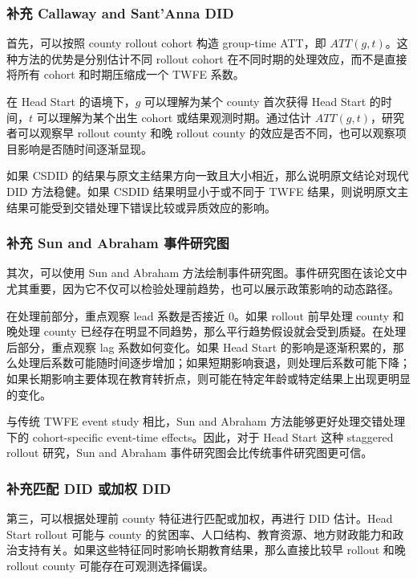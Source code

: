 \documentclass[
  fontset=windows]{ctexart}
\begin{document}
\subsubsection{补充 Callaway and Sant'Anna
DID}\label{ux8865ux5145-callaway-and-santanna-did}

首先，可以按照 county rollout cohort 构造 group-time ATT，即
\(ATT(g,t)\)。这种方法的优势是分别估计不同 rollout cohort
在不同时期的处理效应，而不是直接将所有 cohort 和时期压缩成一个 TWFE
系数。

在 Head Start 的语境下，\(g\) 可以理解为某个 county 首次获得 Head Start
的时间，\(t\) 可以理解为某个出生 cohort 或结果观测时期。通过估计
\(ATT(g,t)\)，研究者可以观察早 rollout county 和晚 rollout county
的效应是否不同，也可以观察项目影响是否随时间逐渐显现。

如果 CSDID 的结果与原文主结果方向一致且大小相近，那么说明原文结论对现代
DID 方法稳健。如果 CSDID 结果明显小于或不同于 TWFE
结果，则说明原文主结果可能受到交错处理下错误比较或异质效应的影响。

\subsubsection{补充 Sun and Abraham
事件研究图}\label{ux8865ux5145-sun-and-abraham-ux4e8bux4ef6ux7814ux7a76ux56fe}

其次，可以使用 Sun and Abraham
方法绘制事件研究图。事件研究图在该论文中尤其重要，因为它不仅可以检验处理前趋势，也可以展示政策影响的动态路径。

在处理前部分，重点观察 lead 系数是否接近 0。如果 rollout 前早处理 county
和晚处理 county
已经存在明显不同趋势，那么平行趋势假设就会受到质疑。在处理后部分，重点观察
lag 系数如何变化。如果 Head Start
的影响是逐渐积累的，那么处理后系数可能随时间逐步增加；如果短期影响衰退，则处理后系数可能下降；如果长期影响主要体现在教育转折点，则可能在特定年龄或特定结果上出现更明显的变化。

与传统 TWFE event study 相比，Sun and Abraham
方法能够更好处理交错处理下的 cohort-specific event-time
effects。因此，对于 Head Start 这种 staggered rollout 研究，Sun and
Abraham 事件研究图会比传统事件研究图更可信。

\subsubsection{补充匹配 DID 或加权
DID}\label{ux8865ux5145ux5339ux914d-did-ux6216ux52a0ux6743-did}

第三，可以根据处理前 county 特征进行匹配或加权，再进行 DID 估计。Head
Start rollout 可能与 county
的贫困率、人口结构、教育资源、地方财政能力和政治支持有关。如果这些特征同时影响长期教育结果，那么直接比较早
rollout 和晚 rollout county 可能存在可观测选择偏误。
\end{document}
